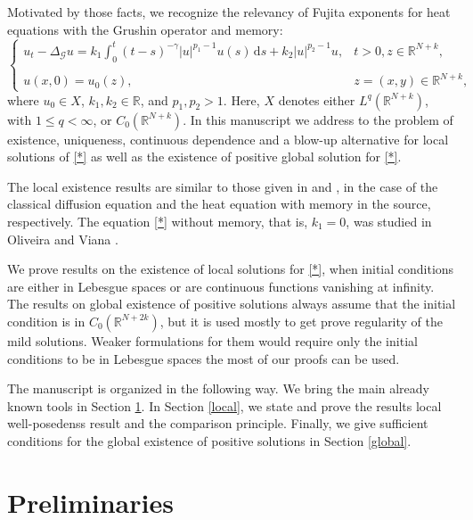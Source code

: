 \documentclass[a4,psfig,english,12pt,epsf,portrait]{article}
\numberwithin{equation}{section}
\def\R{{\mathbb {R}}}
\newcommand{\abs}[1]{\lvert#1\rvert}
\def\R{\mathbb{R}}
\begin{document}
Motivated by those facts, we recognize the relevancy of Fujita exponents for  heat equations with the Grushin operator and memory: 
\begin{equation}\label{*}
	\left\{\begin{array}{ll}
		\displaystyle {u_{t}-\Delta_{\mathcal{G}}
			u = k_1 \int_0^t(t-s)^{-\gamma}\abs{u}^{p_1-1}u(s)\,\mathrm{d}s} + k_2|u|^{p_2-1}u, &\displaystyle {t>0,z\in {\mathbb{R}}^{N+k},}\\
		{}\\
		\displaystyle{u(x,0)=  u_0(z),\qquad\qquad}&\displaystyle{z=(x,y)\in {\mathbb{R}}^{N+k},}
	\end{array}
	\right.
\end{equation}
where $u_0 \in X$, $k_1,k_2\in \R$, and $p_1,p_2>1$.  Here, $X$ denotes either $L^q(\mathbb{R}^{N+k})$, with $1\leq q< \infty$, or $C_0(\mathbb{R}^{N+k})$. In this manuscript we address to the problem of existence, uniqueness, continuous dependence  and a blow-up alternative for local solutions of \eqref{*} as well as the existence of positive global solution for \eqref{*}.


The local existence results are similar to those given in \cite{BrezisCaz} and \cite{CDW}, in the case of the classical diffusion equation and the heat equation with memory in the source, respectively. The equation \eqref{*} without memory, that is, $k_1=0$, was studied in Oliveira and Viana \cite{Oli-Vi-23}. 


We prove results on the existence of local solutions for \eqref{*}, when initial conditions are either in Lebesgue spaces or are continuous functions vanishing at infinity. The results on global existence of positive solutions always assume that the initial condition is in $C_0(\mathbb{R}^{N+2k})$, but it is used mostly to get prove regularity of the mild solutions. Weaker formulations for them would require only the initial conditions to be in Lebesgue spaces the most of our proofs can be used.

The manuscript is organized in the following way. We bring the main already known tools in Section \ref{pre}. In Section \ref{local}, we state and prove the results local well-posedenss result and the comparison principle. Finally, we give sufficient conditions for the global existence of positive solutions in Section \ref{global}.


\section{Preliminaries}\label{pre}
\end{document}
